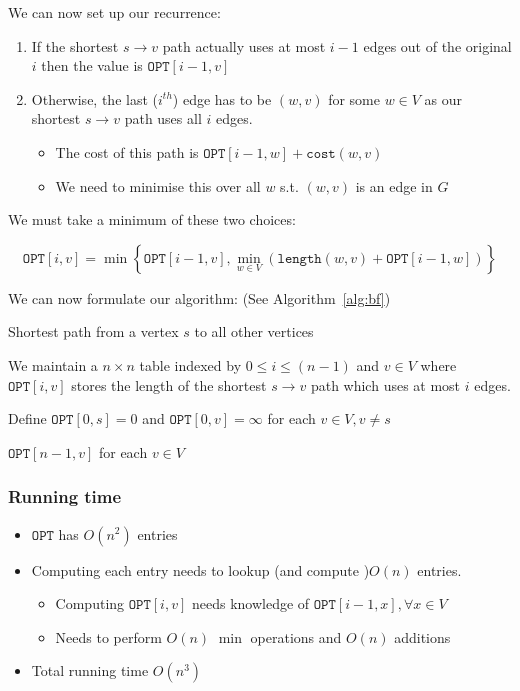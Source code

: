 \documentclass{article}
\begin{document}
We can now set up our recurrence:

\begin{enumerate}
  \item If the shortest $s \rightarrow v$ path actually uses at most $i-1$ edges out of the original $i$ then the value is $\texttt{OPT} [i-1,v]$
  \item Otherwise, the last ($i^{th}$) edge has to be $(w,v)$ for some $w \in V$ as our shortest $s \rightarrow v$ path uses all $i$ edges.

        \begin{itemize}
          \item The cost of this path is $\texttt{OPT}[i-1,w] + \texttt{cost}(w,v)$
                \item We need to minimise this over all $w$ s.t. $(w,v)$ is an edge in $G$
        \end{itemize}
\end{enumerate}

We must take a minimum of these two choices:

\[
  \texttt{OPT}[i,v] = \min \left\{ \texttt{OPT}[i-1,v], \displaystyle\min_{w\in V}\left(\texttt{length}(w,v) + \texttt{OPT}[i-1,w]\right) \right\}
\]

We can now formulate our algorithm: (See Algorithm~\ref{alg:bf})

\begin{algorithm}\label{alg:bf}
  \caption{Shortest path from a vertex $s$ to all other vertices}
  We maintain a $n \times n$ table indexed by $0 \leq i \leq (n-1)$ and $v \in V$ where $\texttt{OPT} [i,v]$ stores the length of the shortest $s \rightarrow v$ path which uses at most $i$ edges.

  Define $\texttt{OPT} [0,s] = 0$ and $\texttt{OPT} [0,v] = \infty$ for each $v \in V, v\neq s$

  \Return $\texttt{OPT} [n-1,v]$ for each $v \in V$
\end{algorithm}

\subsubsection{Running time}

\begin{itemize}
  \item $\texttt{OPT} $ has $O(n^{2})$ entries
  \item Computing each entry needs to lookup (and compute )$O(n)$ entries.
        \begin{itemize}
          \item Computing $\texttt{OPT} [i,v]$ needs knowledge of $\texttt{OPT} [i-1,x], \forall x \in V$
          \item Needs to perform $O(n)$ $\min$ operations and $O(n)$ additions
        \end{itemize}
        \item Total running time $O(n^{3})$
\end{itemize}
\end{document}
